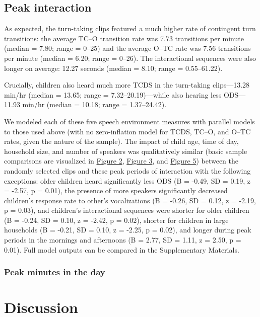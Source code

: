 \documentclass[floatsintext,man]{apa6}
\theoremstyle{definition}
\theoremstyle{definition}
\theoremstyle{definition}
\theoremstyle{remark}
\begin{document}
\subsection{Peak interaction}\label{peak-interaction}

As expected, the turn-taking clips featured a much higher rate of
contingent turn transitions: the average TC--O transition rate was 7.73
transitions per minute (median = 7.80; range = 0--25) and the average
O--TC rate was 7.56 transitions per minute (median = 6.20; range =
0--26). The interactional sequences were also longer on average: 12.27
seconds (median = 8.10; range = 0.55--61.22).

Crucially, children also heard much more TCDS in the turn-taking
clips---13.28 min/hr (median = 13.65; range = 7.32--20.19)---while also
hearing less ODS---11.93 min/hr (median = 10.18; range = 1.37--24.42).

We modeled each of these five speech environment measures with parallel
models to those used above (with no zero-inflation model for TCDS,
TC--O, and O--TC rates, given the nature of the sample). The impact of
child age, time of day, household size, and number of speakers was
qualitatively similar (basic sample comparisons are visualized in
\protect\hyperlink{fig2}{Figure 2}, \protect\hyperlink{fig3}{Figure 3},
and \protect\hyperlink{fig5}{Figure 5}) between the randomly selected
clips and these peak periods of interaction with the following
exceptions: older children heard significantly less ODS (B = -0.49, SD =
0.19, z = -2.57, p = 0.01), the presence of more speakers significantly
decreased children's response rate to other's vocalizations (B = -0.26,
SD = 0.12, z = -2.19, p = 0.03), and children's interactional sequences
were shorter for older children (B = -0.24, SD = 0.10, z = -2.42, p =
0.02), shorter for children in large households (B = -0.21, SD = 0.10, z
= -2.25, p = 0.02), and longer during peak periods in the mornings and
afternoons (B = 2.77, SD = 1.11, z = 2.50, p = 0.01). Full model outputs
can be compared in the Supplementary Materials.

\subsubsection{Peak minutes in the day}\label{peak-minutes-in-the-day}

\section{Discussion}\label{disc}
\end{document}
